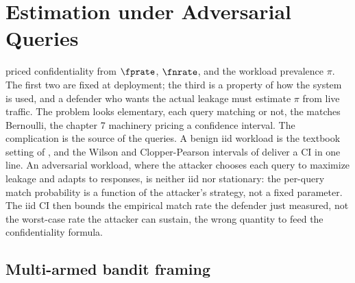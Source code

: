 %

\section{Estimation under Adversarial Queries}
\label{sec:adversarial-estimation}

 priced confidentiality from $\fprate$,
$\fnrate$, and the workload prevalence $\pi$. The first two are fixed at
deployment; the third is a property of how the system is used, and a
defender who wants the actual leakage must estimate $\pi$ from live
traffic. The problem looks elementary, each query matching or not, the
matches Bernoulli, the chapter 7 machinery pricing a confidence interval.
The complication is the source of the queries. A benign iid workload is
the textbook setting of , and the Wilson and
Clopper-Pearson intervals of  deliver a CI
in one line. An adversarial workload, where the attacker chooses each
query to maximize leakage and adapts to responses, is neither iid nor
stationary: the per-query match probability is a function of the
attacker's strategy, not a fixed parameter. The iid CI then bounds the
empirical match rate the defender just measured, not the worst-case rate
the attacker can sustain, the wrong quantity to feed the confidentiality
formula.

\subsection*{Multi-armed bandit framing}

